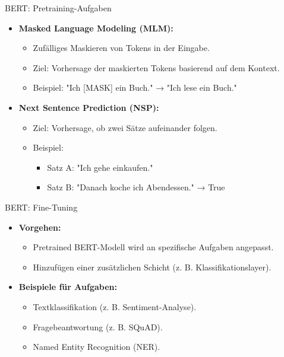 \documentclass[aspectratio=1610, xcolor=dvipsnames, 9pt]{beamer}
\begin{document}
\begin{frame}{BERT: Pretraining-Aufgaben}
  \begin{itemize}
    \item \textbf{Masked Language Modeling (MLM):}
      \begin{itemize}
        \item Zufälliges Maskieren von Tokens in der Eingabe.
        \item Ziel: Vorhersage der maskierten Tokens basierend auf dem Kontext.
        \item Beispiel: "Ich [MASK] ein Buch." → "Ich lese ein Buch."
      \end{itemize}
    \item \textbf{Next Sentence Prediction (NSP):}
      \begin{itemize}
        \item Ziel: Vorhersage, ob zwei Sätze aufeinander folgen.
        \item Beispiel:
          \begin{itemize}
            \item Satz A: "Ich gehe einkaufen."
            \item Satz B: "Danach koche ich Abendessen." → True
          \end{itemize}
      \end{itemize}
  \end{itemize}
\end{frame}

\begin{frame}{BERT: Fine-Tuning}
  \begin{itemize}
    \item \textbf{Vorgehen:}
      \begin{itemize}
        \item Pretrained BERT-Modell wird an spezifische Aufgaben angepasst.
        \item Hinzufügen einer zusätzlichen Schicht (z. B. Klassifikationslayer).
      \end{itemize}
    \item \textbf{Beispiele für Aufgaben:}
      \begin{itemize}
        \item Textklassifikation (z. B. Sentiment-Analyse).
        \item Fragebeantwortung (z. B. SQuAD).
        \item Named Entity Recognition (NER).
      \end{itemize}
  \end{itemize}
\end{frame}
\end{document}
